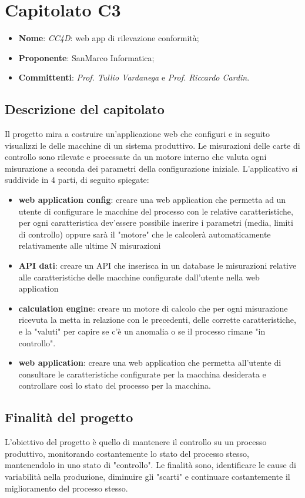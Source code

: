 \section{Capitolato C3}
	\begin{itemize}
		\item \textbf{Nome}: \textit{CC4D}: web app di rilevazione conformità;
		\item \textbf{Proponente}: SanMarco Informatica;
		\item \textbf{Committenti}: \textit{Prof. Tullio Vardanega} e \textit{Prof. Riccardo Cardin}.
	\end{itemize}
	\subsection{Descrizione del capitolato}
	Il progetto mira a costruire un'applicazione web che configuri e in seguito visualizzi le  delle macchine di un sistema produttivo. Le misurazioni delle carte di controllo sono rilevate e processate da un motore interno che valuta ogni misurazione a seconda dei parametri della configurazione iniziale.
	L'applicativo si suddivide in 4 parti, di seguito spiegate:
	\begin{itemize}
		\item \textbf{web application config}: creare una web application che permetta ad un utente di configurare le macchine del processo con le relative caratteristiche, per ogni caratteristica dev'essere possibile inserire i parametri (media, limiti di controllo) oppure sarà il "motore" che le calcolerà automaticamente relativamente alle ultime N misurazioni
		\item \textbf{API dati}: creare un API che inserisca in un database le misurazioni relative alle caratteristiche delle macchine configurate dall'utente nella web application
		\item \textbf{calculation engine}: creare un motore di calcolo che per ogni misurazione ricevuta la metta in relazione con le precedenti, delle corrette caratteristiche, e la "valuti" per capire se c'è un anomalia o se il processo rimane "in controllo".
		\item \textbf{web application}: creare una web application che permetta all'utente di consultare le caratteristiche configurate per la macchina desiderata e controllare così lo stato del processo per la macchina.
	\end{itemize}
	\subsection{Finalità del progetto}
	L'obiettivo del progetto è quello di mantenere il controllo su un processo produttivo, monitorando costantemente lo stato del processo stesso, mantenendolo in uno stato di "controllo". Le finalità sono, identificare le cause di variabilità nella produzione, diminuire gli "scarti" e continuare costantemente il miglioramento del processo stesso.
